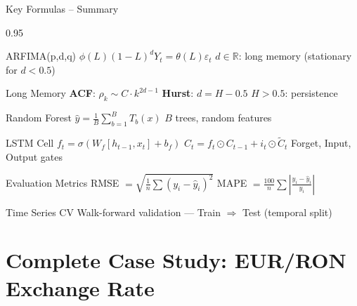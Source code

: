 \documentclass[9pt, aspectratio=169, t]{beamer}
\begin{document}
\begin{frame}{Key Formulas -- Summary}
    \begin{cminipage}{0.95\textwidth}
    \vspace{-0.3cm}
    {\scriptsize
            \begin{block}{ARFIMA(p,d,q)}
                $\phi(L)(1-L)^d Y_t = \theta(L)\varepsilon_t$ \quad $d \in \mathbb{R}$: long memory (stationary for $d < 0.5$)
            \end{block}
            \vspace{-0.1cm}
            \begin{block}{Long Memory}
                \textbf{ACF}: $\rho_k \sim C \cdot k^{2d-1}$ \quad \textbf{Hurst}: $d = H - 0.5$ \quad $H > 0.5$: persistence
            \end{block}
            \vspace{-0.1cm}
            \begin{block}{Random Forest}
                $\hat{y} = \frac{1}{B}\sum_{b=1}^{B} T_b(x)$ \quad $B$ trees, random features
            \end{block}
            \vspace{-0.1cm}
            \begin{block}{LSTM Cell}
                $f_t = \sigma(W_f[h_{t-1}, x_t] + b_f)$ \quad $C_t = f_t \odot C_{t-1} + i_t \odot \tilde{C}_t$ \quad Forget, Input, Output gates
            \end{block}
            \vspace{-0.1cm}
            \begin{block}{Evaluation Metrics}
                RMSE $= \sqrt{\frac{1}{n}\sum(y_i - \hat{y}_i)^2}$ \quad MAPE $= \frac{100}{n}\sum\left|\frac{y_i - \hat{y}_i}{y_i}\right|$
            \end{block}
            \vspace{-0.1cm}
            \begin{block}{Time Series CV}
                Walk-forward validation --- Train $\Rightarrow$ Test (temporal split)
            \end{block}
    }
    \end{cminipage}
\end{frame}

\section{Complete Case Study: EUR/RON Exchange Rate}
\end{document}
